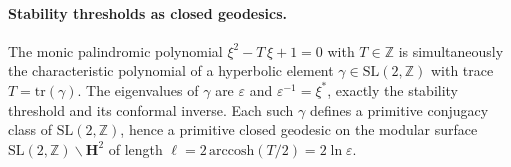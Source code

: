 \paragraph{Stability thresholds as closed geodesics.}
The monic palindromic polynomial $\xi^2 - T\,\xi + 1 = 0$
with $T \in \mathbb{Z}$ is simultaneously the characteristic polynomial
of a hyperbolic element $\gamma \in \mathrm{SL}(2,\mathbb{Z})$
with trace $T = \mathrm{tr}(\gamma)$.  The eigenvalues of $\gamma$
are $\varepsilon$ and $\varepsilon^{-1} = \xi^*$, exactly the
stability threshold and its conformal inverse.
Each such $\gamma$ defines a primitive conjugacy class of
$\mathrm{SL}(2,\mathbb{Z})$, hence a primitive closed geodesic
on the modular surface $\mathrm{SL}(2,\mathbb{Z})\backslash
\mathbf{H}^2$ of length
$\ell = 2\,\mathrm{arccosh}(T/2) = 2\ln\varepsilon$.

